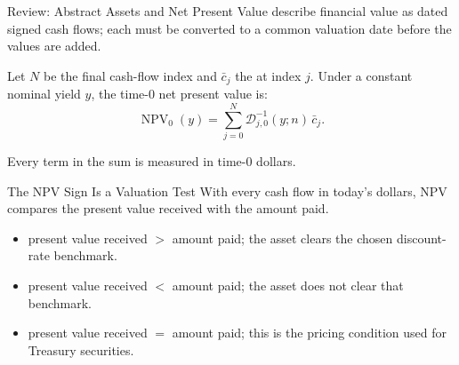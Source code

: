 \documentclass[aspectratio=169,11pt]{beamer}
\begin{document}
\begin{frame}{Review: Abstract Assets and Net Present Value}
  \vspace{0.3em}
   describe financial value as dated signed cash flows;
  each must be converted to a common valuation date before the values are added.

  \vspace{0.5em}
  Let $N$ be the final cash-flow index and $\bar c_j$ the  at index $j$. Under a constant nominal yield $y$, the time-0 net present
  value is:
  \[
    \operatorname{NPV}_{0}(y)=\sum_{j=0}^{N}\mathcal D_{j,0}^{-1}(y;n)\,\bar c_j .
  \]

  \vspace{0.3em}
  Every term in the sum is measured in time-0 dollars.

\end{frame}

\begin{frame}{The NPV Sign Is a Valuation Test}
  With every cash flow in today's dollars, NPV compares the present value
  received with the amount paid.

  \vspace{0.5em}
  \begin{itemize}\setlength{\itemsep}{0.55em}
    \item \textbf{} present value received $>$ amount paid;
      the asset clears the chosen discount-rate benchmark.
    \item \textbf{} present value received $<$ amount paid;
      the asset does not clear that benchmark.
    \item \textbf{} present value received $=$ amount paid; this is
      the pricing condition used for Treasury securities.
  \end{itemize}

  \vspace{0.3em}
\end{frame}
\end{document}
